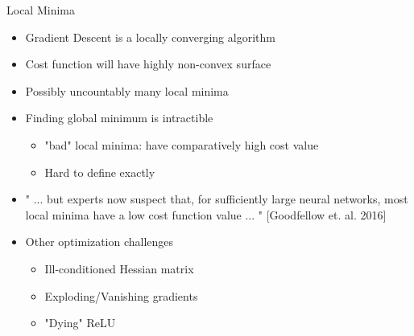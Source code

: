 \documentclass[11pt,t]{beamer}
\begin{document}
\begin{frame}[fragile]{Local Minima}
	\begin{itemize}
		\item Gradient Descent is a locally converging algorithm
		\item Cost function will have highly non-convex surface
		\item Possibly uncountably many local minima
		\item Finding global minimum is intractible
		\begin{itemize}
			\item "bad" local minima: have comparatively high cost value
			\item Hard to define exactly
		\end{itemize}
		\item " ... but experts now suspect that,
for suﬃciently large neural networks, most local minima have a low cost function
value ... " [Goodfellow et. al. 2016]
		\item Other optimization challenges
		\begin{itemize}
			\item Ill-conditioned Hessian matrix
			\item Exploding/Vanishing gradients
			\item "Dying" ReLU
		\end{itemize}
	\end{itemize}
\end{frame}
\end{document}
